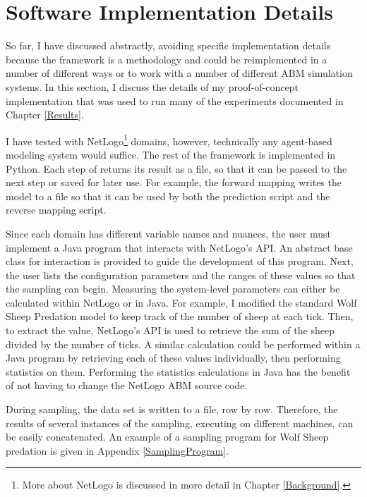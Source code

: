 \section{Software Implementation Details}
So far, I have discussed \fw abstractly, avoiding specific implementation details because the framework is a methodology and could be reimplemented in a number of different ways or to work with a number of different ABM simulation systems.
In this section, I discuss the details of my proof-of-concept implementation that was used to run many of the experiments documented in Chapter \ref{Results}.

I have tested \fw with NetLogo\footnote{More about NetLogo is discussed in more detail in Chapter \ref{Background}.} domains, however, technically any agent-based modeling system would suffice.
The rest of the framework is implemented in Python.
Each step of \fw returns its result as a file, so that it can be passed to the next step or saved for later use.
For example, the forward mapping writes the model to a file so that it can be used by both the prediction script and the reverse mapping script.

Since each domain has different variable names and nuances, the user must implement a Java program that interacts with NetLogo's API.
An abstract base class for interaction is provided to guide the development of this program.
Next, the user lists the configuration parameters and the ranges of these values so that the sampling can begin.
Measuring the system-level parameters can either be calculated within NetLogo or in Java.
For example, I modified the standard Wolf Sheep Predation model to keep track of the number of sheep at each tick.
Then, to extract the value, NetLogo's API is used to retrieve the sum of the sheep divided by the number of ticks.
A similar calculation could be performed within a Java program by retrieving each of these values individually, then performing statistics on them.
Performing the statistics calculations in Java has the benefit of not having to change the NetLogo ABM source code.


During sampling, the data set is written to a file, row by row.
Therefore, the results of several instances of the sampling, executing on different machines, can be easily concatenated.
An example of a sampling program for Wolf Sheep predation is given in Appendix \ref{SamplingProgram}.


